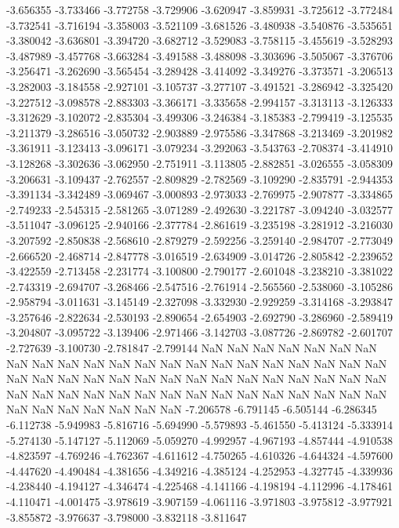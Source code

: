 -3.656355
-3.733466
-3.772758
-3.729906
-3.620947
-3.859931
-3.725612
-3.772484
-3.732541
-3.716194
-3.358003
-3.521109
-3.681526
-3.480938
-3.540876
-3.535651
-3.380042
-3.636801
-3.394720
-3.682712
-3.529083
-3.758115
-3.455619
-3.528293
-3.487989
-3.457768
-3.663284
-3.491588
-3.488098
-3.303696
-3.505067
-3.376706
-3.256471
-3.262690
-3.565454
-3.289428
-3.414092
-3.349276
-3.373571
-3.206513
-3.282003
-3.184558
-2.927101
-3.105737
-3.277107
-3.491521
-3.286942
-3.325420
-3.227512
-3.098578
-2.883303
-3.366171
-3.335658
-2.994157
-3.313113
-3.126333
-3.312629
-3.102072
-2.835304
-3.499306
-3.246384
-3.185383
-2.799419
-3.125535
-3.211379
-3.286516
-3.050732
-2.903889
-2.975586
-3.347868
-3.213469
-3.201982
-3.361911
-3.123413
-3.096171
-3.079234
-3.292063
-3.543763
-2.708374
-3.414910
-3.128268
-3.302636
-3.062950
-2.751911
-3.113805
-2.882851
-3.026555
-3.058309
-3.206631
-3.109437
-2.762557
-2.809829
-2.782569
-3.109290
-2.835791
-2.944353
-3.391134
-3.342489
-3.069467
-3.000893
-2.973033
-2.769975
-2.907877
-3.334865
-2.749233
-2.545315
-2.581265
-3.071289
-2.492630
-3.221787
-3.094240
-3.032577
-3.511047
-3.096125
-2.940166
-2.377784
-2.861619
-3.235198
-3.281912
-3.216030
-3.207592
-2.850838
-2.568610
-2.879279
-2.592256
-3.259140
-2.984707
-2.773049
-2.666520
-2.468714
-2.847778
-3.016519
-2.634909
-3.014726
-2.805842
-2.239652
-3.422559
-2.713458
-2.231774
-3.100800
-2.790177
-2.601048
-3.238210
-3.381022
-2.743319
-2.694707
-3.268466
-2.547516
-2.761914
-2.565560
-2.538060
-3.105286
-2.958794
-3.011631
-3.145149
-2.327098
-3.332930
-2.929259
-3.314168
-3.293847
-3.257646
-2.822634
-2.530193
-2.890654
-2.654903
-2.692790
-3.286960
-2.589419
-3.204807
-3.095722
-3.139406
-2.971466
-3.142703
-3.087726
-2.869782
-2.601707
-2.727639
-3.100730
-2.781847
-2.799144
NaN
NaN
NaN
NaN
NaN
NaN
NaN
NaN
NaN
NaN
NaN
NaN
NaN
NaN
NaN
NaN
NaN
NaN
NaN
NaN
NaN
NaN
NaN
NaN
NaN
NaN
NaN
NaN
NaN
NaN
NaN
NaN
NaN
NaN
NaN
NaN
NaN
NaN
NaN
NaN
NaN
NaN
NaN
NaN
NaN
NaN
NaN
NaN
NaN
NaN
NaN
NaN
NaN
NaN
NaN
NaN
NaN
NaN
NaN
-7.206578
-6.791145
-6.505144
-6.286345
-6.112738
-5.949983
-5.816716
-5.694990
-5.579893
-5.461550
-5.413124
-5.333914
-5.274130
-5.147127
-5.112069
-5.059270
-4.992957
-4.967193
-4.857444
-4.910538
-4.823597
-4.769246
-4.762367
-4.611612
-4.750265
-4.610326
-4.644324
-4.597600
-4.447620
-4.490484
-4.381656
-4.349216
-4.385124
-4.252953
-4.327745
-4.339936
-4.238440
-4.194127
-4.346474
-4.225468
-4.141166
-4.198194
-4.112996
-4.178461
-4.110471
-4.001475
-3.978619
-3.907159
-4.061116
-3.971803
-3.975812
-3.977921
-3.855872
-3.976637
-3.798000
-3.832118
-3.811647
